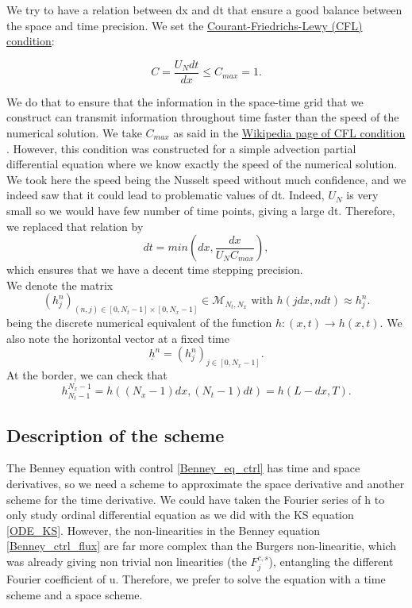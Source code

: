 \documentclass[12pt]{article}
\begin{document}
We try to have a relation between dx and dt that ensure a good balance between the space and time precision. We set the \underline{Courant-Friedrichs-Lewy (CFL) condition}: 

\begin{equation}\label{CFL_conditions}
    C=\frac{U_N dt}{dx}\leq C_{max}=1.
\end{equation}

We do that to ensure that the information in the space-time grid that we construct can transmit information throughout time faster than the speed of the numerical solution. We take $C_{max}$ as said in the \href{https://en.wikipedia.org/wiki/Courant%E2%80%93Friedrichs%E2%80%93Lewy_condition}{Wikipedia page of CFL condition }. However, this condition was constructed for a simple advection partial differential equation where we know exactly the speed of the numerical solution. We took here the speed being the Nusselt speed without much confidence, and we indeed saw that it could lead to problematic values of dt. Indeed, $U_N$ is very small so we would have few number of time points, giving a large dt. Therefore, we replaced that relation by
\begin{equation}\label{time_step}
dt=min(dx, \frac{dx}{U_N C_{max}}),
\end{equation}
which ensures that we have a decent time stepping precision.
\\

We denote the matrix 
\begin{equation}
(h_j^n)_{(n, j)\in [0,N_t-1]\times[0, N_x-1]} \in \mathcal{M}_{N_t, N_x}  \text{ with } h(jdx,ndt) \approx h_j^n.
\end{equation}
being the discrete numerical equivalent of the function $h:(x,t)\rightarrow h(x,t).$
We also note the horizontal vector at a fixed time $$\underline{h}^n = (h_j^n)_{j\in[0, N_x-1]}.$$
At the border, we can check that $$h_{N_t-1}^{N_x-1}=h((N_x-1)dx,(N_t-1)dt)= h(L-dx, T).$$


\subsection{Description of the scheme}

The Benney equation with control \eqref{Benney_eq_ctrl} has time and space derivatives, so we need a scheme to approximate 
the space derivative and another scheme for the time derivative. We could have taken the Fourier series of h to only study 
ordinal differential equation as we did with the KS equation \eqref{ODE_KS}. However, the non-linearities in the Benney 
equation \eqref{Benney_ctrl_flux} are far more complex than the Burgers non-linearitie, which was already giving non 
trivial non linearities (the $F_j^{c,s}$), entangling the different Fourier coefficient of u. Therefore, we prefer to 
solve the equation with a time scheme and a space scheme. 
\end{document}
